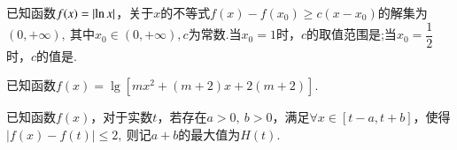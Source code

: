 \documentclass{BHCexam}
\begin{document}
\begin{questions}
\qs 已知函数$f(x)=\left|\ln x \right|$，关于$ x $的不等式$ f(x)-f(x_0)\ge c(x-x_0) $的解集为$ \left(0,+\infty\right),~ $其中$ x_0\in \left(0,+\infty\right),c\text{为常数} .$当$ x_0=1 $时，$ c $的取值范围是\tk;当$ x_0=\dfrac{1}{2} $时，$ c $的值是\tk.

\qs 已知函数$f(x)=\lg\left[mx^2+(m+2)x+2(m+2)\right]$.
\qs 已知函数$f(x)$，对于实数$ t $，若存在$ a>0,~b>0$，满足$ \forall x\in [t-a,t+b] $，使得$ \left|f(x)-f(t)\right|\le 2,~ $则记$ a+b $的最大值为$ H(t) .$



\end{questions}
\end{document}

